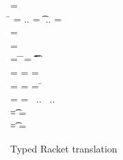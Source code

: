 \documentclass[acmlarge, anonymous, authordraft, review]{acmart} %
\begin{document}
\begin{figure}[!h]

\hrulefill

\medskip

 \small
\begin{minipage}{12cm}  
\begin{tabbing}
 =  \\
\hspace{4.6cm}\= \WHERE\HS 
  \mdp[1] = \src{\Mdef\m\x\t\tp{\ep[1]}} ..\HS\HS
  \md[1] = \Mdef\m\x\t\tp{\e[1]} ..\HS\HS
  \ep[1] = \TRG{\e[1]}{\x:\t\,\this:\C}
\\
\TRG\x\Env = \src{\x}
\\
\TRG{\FRead\f}\Env  = \src{\FRead\f}
\\
\TRG{\FWrite\f\e}\Env =  \src{\FWrite\f\ep} 
\>\WHERE\HS
\= \TypeCk\K{\this}\C \HS\HS
\=  \ep = \TAG\e\Env\t \HS\HS
\= \Ftype\f\t\In\App\K\C
\\
\TRG{\Call{\e[1]}\m{\e[2]}}\Env = \src{\DynCall{\ep[1]}\m{\ep[2]}}
\>\WHERE \> \TypeCk{\K,\Env}{\e[1]}\any \HS
\> \ep[1] = \TRG{\e[1]}\Env \HS
\> \ep[2] = \TAG{\e[2]}\Env\any
\\
\TRG{\Call{\e[1]}\m{\e[2]}}\Env = \src{\KCall{\ep[1]}\m{\ep[2]}{\D[1]}{\D[2]}}
\>\WHERE \> \TypeCk{\K,\Env}{\e[1]}\C 
\> \ep[1] = \TRG{\e[1]}\Env\HS\HS
\> \ep[2] = \TAG{\e[2]}\Env{\D[1]} \HS\HS
\=  \Mtype\m{\D[1]}{\D[2]}\In\App\K\C 
\\
\Env =  
\>\WHERE \>  \ep[1] = \TAG{\e[1]}\Env{\t[1]} ~..
\> \Ftype{\f[1]}{\t[1]}\In\App\K\C ~..
\\
\TAG\e\Env\t = \src\ep
\> \WHERE\> \TypeCk{\K,\Env}\e\tp \HS
\> \EM{\K\vdash \t \Sub \tp}
\>  \ep = \TRG\e\Env
\\
\TAG\e\Env\t = \src{\BehCast\t\e}
\>\WHERE\> \TypeCk{\K,\Env}\e\tp \HS
   \> \EM{\K\vdash \t \not \Sub \tp}
  \>     \ep = \TRG\e\Env
\end{tabbing}
\end{minipage}

\medskip

\hrulefill
\caption{Typed Racket translation}\label{trtr}
\end{figure}
\end{document}
